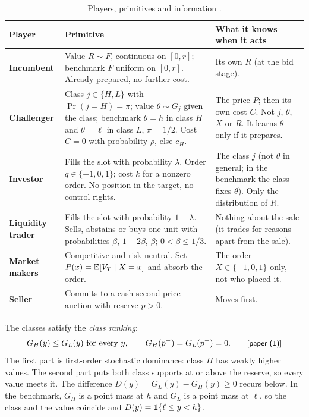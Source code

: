 \begin{table}[!ht]
\centering\small
\begin{tabularx}{\linewidth}{@{}>{\bfseries}l X X@{}}
\toprule
\textnormal{Player} & Primitive & What it knows when it acts\\
\midrule
Incumbent & Value \(R\sim F\), continuous on \([0,\bar r]\); benchmark \(F\) uniform on \([0,r]\). Already
prepared, no further cost. & Its own \(R\) (at the bid stage).\\[3pt]
Challenger & Class \(j\in\{H,L\}\) with \(\Pr(j=H)=\pi\); value \(\theta\sim G_j\) given the class;
benchmark \(\theta=h\) in class \(H\) and \(\theta=\ell\) in class \(L\), \(\pi=1/2\). Cost \(C=0\) with
probability \(\rho\), else \(c_H\). & The price \(P\); then its own cost \(C\). Not \(j\), \(\theta\),
\(X\) or \(R\). It learns \(\theta\) only if it prepares.\\[3pt]
Investor & Fills the slot with probability \(\lambda\). Order \(q\in\{-1,0,1\}\); cost \(k\) for a nonzero
order. No position in the target, no control rights. & The class \(j\) (not \(\theta\) in general; in the
benchmark the class fixes \(\theta\)). Only the distribution of \(R\).\\[3pt]
Liquidity trader & Fills the slot with probability \(1-\lambda\). Sells, abstains or buys one unit with
probabilities \(\beta\), \(1-2\beta\), \(\beta\); \(0<\beta\le1/3\). & Nothing about the sale (it trades
for reasons apart from the sale).\\[3pt]
Market makers & Competitive and risk neutral. Set \(P(x)=\mathbb{E}[V_T\mid X=x]\) and absorb the order. & The
order \(X\in\{-1,0,1\}\) only, not who placed it.\\[3pt]
Seller & Commits to a cash second-price auction with reserve \(p>0\). & Moves first.\\
\bottomrule
\end{tabularx}
\caption{Players, primitives and information .}
\label{tab:02_model-players}
\end{table}

The classes satisfy the \emph{class ranking}:
\[
G_H(y)\le G_L(y)\ \text{for every }y,\qquad G_H(p^-)=G_L(p^-)=0. \tag*{\paper{(1)}}
\]
The first part is first-order stochastic dominance: class \(H\) has weakly higher values. The second part puts
both class supports at or above the reserve, so every value meets it. The difference
\(D(y)=G_L(y)-G_H(y)\ge0\) recurs below. In the benchmark, \(G_H\) is a point mass at \(h\) and \(G_L\)
is a point mass at \(\ell\), so the class and the value coincide and \(D(y)=\mathbf{1}\{\ell\le y<h\}\).

